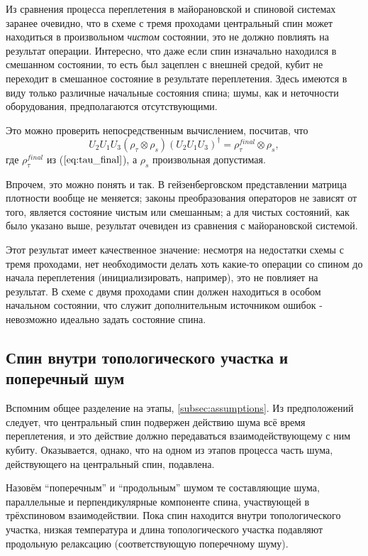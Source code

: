 \documentclass[a4paper,12pt]{article}
\theoremstyle{plain} %
\theoremstyle{definition} %
\theoremstyle{remark} %
\begin{document}
Из сравнения процесса переплетения в майорановской и спиновой системах заранее очевидно, что в схеме с тремя проходами центральный спин может находиться в произвольном \textit{чистом} состоянии, это не должно повлиять на результат операции.
Интересно, что даже если спин изначально находился в смешанном состоянии, то есть был зацеплен с внешней средой, кубит не переходит в смешанное состояние в результате переплетения. 
Здесь имеются в виду только различные начальные состояния спина; шумы, как и неточности оборудования, предполагаются отсутствующими.

Это можно проверить непосредственным вычислением, посчитав, что
\begin{equation}
    U_2 U_1 U_3 (\rho_\tau \otimes \rho_s) (U_2 U_1 U_3)^\dagger = \rho^{final}_\tau \otimes \rho_s
    \label{eq:u213_general},
\end{equation}
где $\rho^{final}_\tau$ из ($\ref{eq:tau_final}$), а $\rho_s$ произвольная допустимая.

Впрочем, это можно понять и так. В гейзенберговском представлении матрица плотности вообще не меняется; законы преобразования операторов не зависят от того, является состояние чистым или смешанным; а для чистых состояний, как было указано выше, результат очевиден из сравнения с майорановской системой.

Этот результат имеет качественное значение: несмотря на недостатки схемы с тремя проходами, нет необходимости делать хоть какие-то операции со спином до начала переплетения (инициализировать, например), это не повлияет на результат. 
В схеме с двумя проходами спин должен находиться в особом начальном состоянии, что служит дополнительным источником ошибок - невозможно идеально задать состояние спина.

\subsection{Спин внутри топологического участка и поперечный шум} \label{subsec:inside_transverse}

Вспомним общее разделение на этапы, \ref{subsec:assumptions}. 
Из предположений следует, что центральный спин подвержен действию шума всё время переплетения, и это действие должно передаваться взаимодействующему с ним кубиту. Оказывается, однако, что на одном из этапов процесса часть шума, действующего на центральный спин, подавлена.

Назовём ``поперечным'' и ``продольным'' шумом те составляющие шума, параллельные и перпендикулярные компоненте спина, участвующей в трёхспиновом взаимодействии.
Пока спин находится внутри топологического участка, низкая температура и длина топологического участка подавляют продольную релаксацию (соответствующую поперечному шуму).
\end{document}
